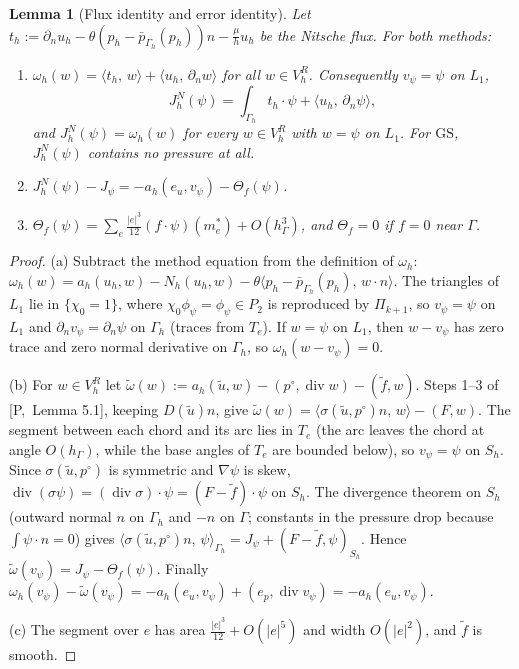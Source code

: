 \documentclass[11pt,reqno]{amsart}
\theoremstyle{plain}
\newtheorem{lemma}[theorem]{Lemma}
\theoremstyle{definition}
\newcommand{\hG}{h_\Gamma}
\newcommand{\Gh}{\Gamma_h}
\newcommand{\VR}{V_h^R}
\newcommand{\dn}{\partial_n}
\newcommand{\ut}{\tilde u}
\newcommand{\ft}{\tilde f}
\newcommand{\pbar}{\bar p}
\newcommand{\ip}[2]{\langle #1,\, #2\rangle}
\newcommand{\GS}{\mathrm{GS}}
\renewcommand{\div}{\operatorname{div}}
\newcommand{\Pref}[1]{\textup{[P,~#1]}}
\newcommand{\Lay}{L_1}
\begin{document}
\begin{lemma}[Flux identity and error identity]\label{pd:lem:dragid}
Let $t_h:=\dn u_h-\theta(p_h-\pbar_{\Gh}(p_h))n-\frac\mu hu_h$ be the Nitsche flux. For both methods:
\begin{enumerate}[label=(\alph*)]
\item $\omega_h(w)=\ip{t_h}w+\ip{u_h}{\dn w}$ for all $w\in\VR$. Consequently $v_\psi=\psi$ on $\Lay$,
\[
J^N_h(\psi)=\int_{\Gh}t_h\cdot\psi+\ip{u_h}{\dn\psi},
\]
and $J^N_h(\psi)=\omega_h(w)$ for every $w\in\VR$ with $w=\psi$ on $\Lay$. For $\GS$, $J^N_h(\psi)$ contains no pressure at all.
\item $J^N_h(\psi)-J_\psi=-a_h(e_u,v_\psi)-\Theta_f(\psi)$.
\item $\Theta_f(\psi)=\sum_e\frac{|e|^3}{12}(f\cdot\psi)(m_e^\ast)+O(\hG^3)$, and $\Theta_f=0$ if $f=0$ near $\Gamma$.
\end{enumerate}
\end{lemma}

\begin{proof}
(a) Subtract the method equation from the definition of $\omega_h$: $\omega_h(w)=a_h(u_h,w)-N_h(u_h,w)-\theta\ip{p_h-\pbar_{\Gh}(p_h)}{w\cdot n}$. The triangles of $\Lay$ lie in $\{\chi_0=1\}$, where $\chi_0\phi_\psi=\phi_\psi\in P_2$ is reproduced by $\Pi_{k+1}$, so $v_\psi=\psi$ on $\Lay$ and $\dn v_\psi=\dn\psi$ on $\Gh$ (traces from $T_e$). If $w=\psi$ on $\Lay$, then $w-v_\psi$ has zero trace and zero normal derivative on $\Gh$, so $\omega_h(w-v_\psi)=0$.

(b) For $w\in\VR$ let $\tilde\omega(w):=a_h(\ut,w)-(p^\circ,\div w)-(\ft,w)$. Steps 1--3 of \Pref{Lemma 5.1}, keeping $D(\ut)n$, give $\tilde\omega(w)=\ip{\sigma(\ut,p^\circ)n}w-(F,w)$. The segment between each chord and its arc lies in $T_e$ (the arc leaves the chord at angle $O(\hG)$, while the base angles of $T_e$ are bounded below), so $v_\psi=\psi$ on $S_h$. Since $\sigma(\ut,p^\circ)$ is symmetric and $\nabla\psi$ is skew, $\div(\sigma\psi)=(\div\sigma)\cdot\psi=(F-\ft)\cdot\psi$ on $S_h$. The divergence theorem on $S_h$ (outward normal $n$ on $\Gh$ and $-n$ on $\Gamma$; constants in the pressure drop because $\int\psi\cdot n=0$) gives $\ip{\sigma(\ut,p^\circ)n}\psi_{\Gh}=J_\psi+(F-\ft,\psi)_{S_h}$. Hence $\tilde\omega(v_\psi)=J_\psi-\Theta_f(\psi)$. Finally $\omega_h(v_\psi)-\tilde\omega(v_\psi)=-a_h(e_u,v_\psi)+(e_p,\div v_\psi)=-a_h(e_u,v_\psi)$.

(c) The segment over $e$ has area $\frac{|e|^3}{12}+O(|e|^5)$ and width $O(|e|^2)$, and $\ft$ is smooth.
\end{proof}
\end{document}
